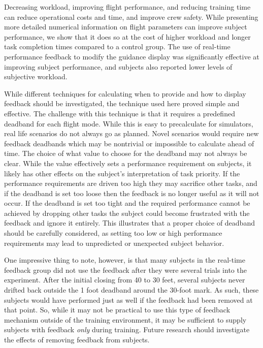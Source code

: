 \documentclass[]{aiaa-tc}%
\begin{document}
Decreasing workload, improving flight performance, and reducing training time can reduce operational costs and time, and improve crew safety.  While presenting more detailed numerical information on flight parameters can improve subject performance, we show that it does so at the cost of higher workload and longer task completion times compared to a control group. The use of real-time performance feedback to modify the guidance display was significantly effective at improving subject performance, and subjects also reported lower levels of subjective workload.

While different techniques for calculating when to provide and how to display feedback should be investigated, the technique used here proved simple and effective. The challenge with this technique is that it requires a predefined deadband for each flight mode. While this is easy to precalculate for simulators, real life scenarios do not always go as planned. Novel scenarios would require new feedback deadbands which may be nontrivial or impossible to calculate ahead of time. The choice of what value to choose for the deadband may not always be clear. While the value effectively sets a performance requirement on subjects, it likely has other effects on the subject's interpretation of task priority. If the performance requirements are driven too high they may sacrifice other tasks, and if the deadband is set too loose then the feedback is no longer useful as it will not occur. If the deadband is set too tight and the required performance cannot be achieved by dropping other tasks the subject could become frustrated with the feedback and ignore it entirely. This illustrates that a proper choice of deadband should be carefully considered, as setting too low or high performance requirements may lead to unpredicted or unexpected subject behavior.

One impressive thing to note, however, is that many subjects in the real-time feedback group did not use the feedback after they were several trials into the experiment. After the initial closing from 40 to 30 feet, several subjects never drifted back outside the 1 foot deadband around the 30-foot mark. As such, these subjects would have performed just as well if the feedback had been removed at that point. So, while it may not be practical to use this type of feedback mechanism outside of the training environment, it may be sufficient to supply subjects with feedback \textit{only} during training. Future research should investigate the effects of removing feedback from subjects.
\end{document}
